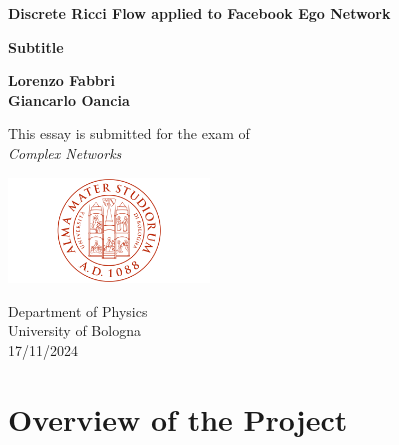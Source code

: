 \documentclass[a4paper,12pt,twoside,online,customfont,custombib,PageStyleI]{Settings/PhDThesisPSnPDF}
\begin{document}
\begin{titlepage}
    \begin{center}
        \vspace*{1cm}
            
        \Huge
        \textbf{Discrete Ricci Flow applied to Facebook Ego Network}
            
        \vspace{0.5cm}
        \large
        \textbf{Subtitle}
            
        \vspace{1.5cm}
        \Large    
        \textbf{Lorenzo Fabbri \\ Giancarlo Oancia}
            
        \vfill
        \large   
        This essay is submitted for the exam of\\
        \textit{Complex Networks}
            
        \vspace{0.8cm}
            
        \includegraphics[width=0.4\textwidth]{Graphics/UniversityCrest.png}
            
        \large
        Department of Physics\\
        University of Bologna\\
        17/11/2024
            
    \end{center}
\end{titlepage}

\frontmatter



\begin{spacing}{1.3}
    \tableofcontents
\end{spacing}

\mainmatter
\chapter{Overview of the Project}

\end{document}
